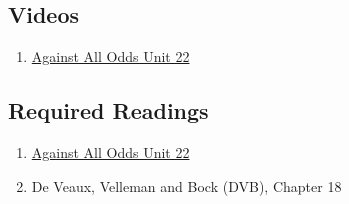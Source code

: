 \documentclass[letterpaper,12pt,twoside,]{pinp}
\providecommand{\tightlist}{%
  \setlength{\itemsep}{0pt}\setlength{\parskip}{0pt}}
\begin{document}
\hypertarget{videos}{%
\subsection{Videos}\label{videos}}

\begin{enumerate}
\def\labelenumi{\arabic{enumi}.}
\tightlist
\item
  \href{https://www.learner.org/series/against-all-odds-inside-statistics/sampling-distributions/}{Against
  All Odds Unit 22}
\end{enumerate}

\hypertarget{required-readings-1}{%
\subsection{Required Readings}\label{required-readings-1}}

\begin{enumerate}
\item \href{https://www.learner.org/wp-content/uploads/2019/03/AgainstAllOdds_StudentGuide_Unit22-Sampling-Distributions.pdf}{Against All Odds Unit 22}
\item De Veaux, Velleman and Bock (DVB), Chapter 18
\end{enumerate}





\end{document}
